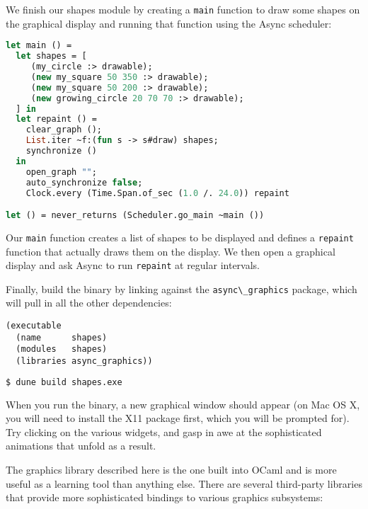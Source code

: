 We finish our shapes module by creating a \passthrough{\lstinline!main!}
function to draw some shapes on the graphical display and running that
function using the Async scheduler:

\begin{lstlisting}[language=Caml]
let main () =
  let shapes = [
     (my_circle :> drawable);
     (new my_square 50 350 :> drawable);
     (new my_square 50 200 :> drawable);
     (new growing_circle 20 70 70 :> drawable);
  ] in
  let repaint () =
    clear_graph ();
    List.iter ~f:(fun s -> s#draw) shapes;
    synchronize ()
  in
    open_graph "";
    auto_synchronize false;
    Clock.every (Time.Span.of_sec (1.0 /. 24.0)) repaint

let () = never_returns (Scheduler.go_main ~main ())
\end{lstlisting}

Our \passthrough{\lstinline!main!} function creates a list of shapes to
be displayed and defines a \passthrough{\lstinline!repaint!} function
that actually draws them on the display. We then open a graphical
display and ask Async to run \passthrough{\lstinline!repaint!} at
regular intervals.

Finally, build the binary by linking against the
\passthrough{\lstinline!async\_graphics!} package, which will pull in
all the other dependencies:

\begin{lstlisting}
(executable
  (name      shapes)
  (modules   shapes)
  (libraries async_graphics))
\end{lstlisting}

\begin{lstlisting}[language=bash]
$ dune build shapes.exe
\end{lstlisting}

When you run the binary, a new graphical window should appear (on Mac OS
X, you will need to install the X11 package first, which you will be
prompted for). Try clicking on the various widgets, and gasp in awe at
the sophisticated animations that unfold as a result.

The graphics library described here is the one built into OCaml and is
more useful as a learning tool than anything else. There are several
third-party libraries that provide more sophisticated bindings to
various graphics subsystems:

